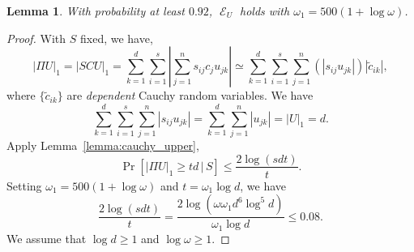 \documentclass[11pt]{article}
\newtheorem{lemma}{Lemma}
\DeclareMathOperator{\E}{\mathcal{E}}
\begin{document}
\begin{lemma}
  \label{lemma:E_U}
  With probability at least $0.92$, $\E_U$ holds with $\omega_1 = 500
  (1 + \log \omega)$.
\end{lemma}
\begin{proof}
  With $S$ fixed, we have,
  \begin{equation*}
    |\Pi U|_1 = |S C U|_1 = \sum_{k=1}^d \sum_{i=1}^s |\sum_{j=1}^n s_{ij} c_{j} u_{jk}| 
    \simeq \sum_{k=1}^d \sum_{i=1}^s \sum_{j=1}^n \left( |s_{ij} u_{jk}| \right) |\tilde{c}_{ik}|,
  \end{equation*}
  where $\{\tilde{c}_{ik}\}$ are \emph{dependent} Cauchy random variables. We have
  \begin{equation*}
    \sum_{k=1}^d \sum_{i=1}^s \sum_{j=1}^n |s_{ij} u_{jk}| = \sum_{k=1}^d \sum_{j=1}^n |u_{jk}| = |U|_1 = d.
  \end{equation*}
  Apply Lemma~\ref{lemma:cauchy_upper},
  \begin{equation*}
    \Pr[|\Pi U|_1 \geq t d \,|\, S] \leq \frac{2 \log (s d t)}{t}.
  \end{equation*}
  Setting $\omega_1 = 500 (1 + \log \omega)$ and $t = \omega_1 \log d$, we have
  \begin{equation*}
    \frac{2 \log (s d t)}{t} 
    = \frac{2 \log ( \omega \omega_1 d^6 \log^5 d )}{\omega_1 \log d} \leq 0.08.
  \end{equation*}
  We assume that $\log d \geq 1$ and $\log \omega \geq 1$.
\end{proof}
\end{document}
